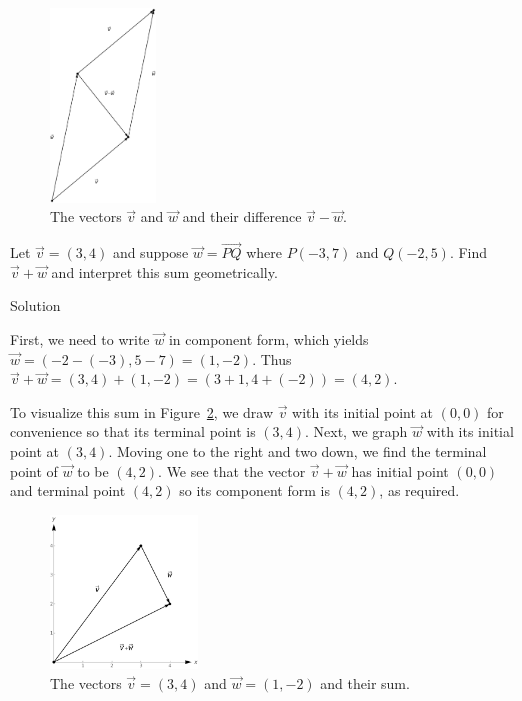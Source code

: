 \begin{figure}[h]
	\begin{center}
			\includegraphics[width=0.25\textwidth]{fig_vector_5}
	\caption{The vectors $\vec{v}$ and $\vec{w}$ and their difference $\vec{v}-\vec{w}$. }
	\label{fig_vector_5}
	\end{center}
\end{figure}

\ifcalculus
\begin{example}  \label{vectoraddex} 
 Let  $\vec{v} = \left(3,4\right)$ and suppose  $\vec{w} = \overrightarrow{PQ}$ where $P(-3,7)$ and $Q(-2,5)$.  Find $\vec{v} + \vec{w}$ and interpret this sum geometrically.


Solution 


First, we need to write  $\vec{w}$ in component form, which yields $\vec{w} = \left(-2-(-3),5-7\right) = \left(1,-2\right)$.  Thus $\vec{v} + \vec{w}  =   \left(3,4\right) + \left(1,-2\right)=\left( 3 + 1, 4 + (-2) \right)=\left(4, 2\right).$


                                        
To visualize this sum in Figure~\ref{fig_vector_6}, we draw $\vec{v}$ with its initial point at $(0,0)$ for convenience so that its terminal point is $(3,4)$.  Next, we graph $\vec{w}$ with its initial point at $(3,4)$.  Moving one to the right and two down, we find the terminal point of $\vec{w}$ to be $(4,2)$.  We see that the vector $\vec{v} + \vec{w}$ has initial point $(0,0)$ and terminal point $(4,2)$ so its component form  is $\left(4,2\right)$, as required.

\begin{figure}[H]
	\begin{center}
			\includegraphics[width=0.35\textwidth]{fig_vector_6}
	\caption{The vectors $\vec{v} = \left(3,4\right)$  and $\vec{w}=\left(1,-2\right)$ and their sum. }
	\label{fig_vector_6}
	\end{center}
\end{figure}


\end{example}
\fi

